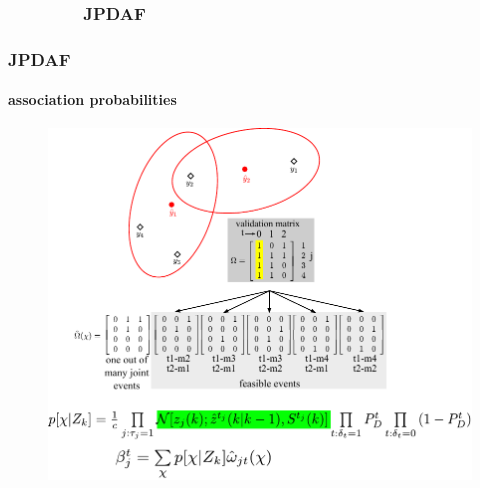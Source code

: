 \subsubsection{\ \ \ \ \ \ \ \ JPDAF }




\begin{frame}
\frametitle{JPDAF}
\framesubtitle{association probabilities}
\logoCSIPCPL\mypagenum 	
	\begin{figure}
		\includegraphics[height=0.80\textheight]{figs/TRK_JPDAF_twoTargetScenario.pdf}
	\end{figure}	
\end{frame}

